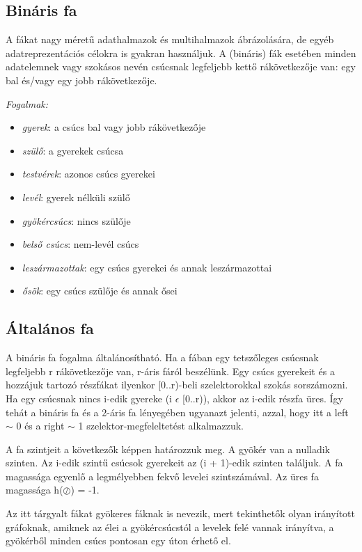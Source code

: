 \documentclass[margin=0px]{article}
\begin{document}
\subsection{Bináris fa}

A fákat nagy méretű adathalmazok és multihalmazok ábrázolására,
de egyéb adatreprezentációs célokra is gyakran használjuk.
A (bináris) fák esetében minden adatelemnek vagy szokásos nevén csúcsnak 
legfeljebb kettő rákövetkezője van: egy bal és/vagy egy
jobb rákövetkezője.

\textit{Fogalmak:}
\begin{itemize}
    \item \textit{gyerek}: a csúcs bal vagy jobb rákövetkezője
    \item \textit{szülő}: a gyerekek csúcsa
    \item \textit{testvérek}: azonos csúcs gyerekei
    \item \textit{levél}: gyerek nélküli szülő
    \item \textit{gyökércsúcs}: nincs szülője
    \item \textit{belső csúcs}: nem-levél csúcs
    \item \textit{leszármazottak}: egy csúcs gyerekei és annak leszármazottai
    \item \textit{ősök}: egy csúcs szülője és annak ősei
\end{itemize}

\subsection{Általános fa}
A bináris fa fogalma általánosítható. Ha a fában egy tetszőleges csúcsnak legfeljebb r rákövetkezője van, r-áris fáról beszélünk. Egy csúcs gyerekeit és a hozzájuk tartozó részfákat ilyenkor [0..r)-beli szelektorokkal szokás sorszámozni. Ha egy csúcsnak nincs i-edik gyereke (i $\epsilon$  [0..r)), akkor az i-edik
részfa üres. Így tehát a bináris fa és a 2-áris fa lényegében ugyanazt jelenti, azzal,
hogy itt a left $\sim$  0 és a right $\sim$ 1 szelektor-megfeleltetést alkalmazzuk.

A fa szintjeit a következők képpen határozzuk meg. A gyökér van a nulladik szinten. Az
i-edik szintű csúcsok gyerekeit az (i + 1)-edik szinten találjuk. A fa magassága egyenlő a legmélyebben fekvő levelei szintszámával. Az üres fa magassága h($\oslash$) = -1.

Az itt tárgyalt fákat gyökeres fáknak is nevezik, mert tekinthetők olyan irányított gráfoknak, amiknek az élei a gyökércsúcstól a levelek felé vannak
irányítva, a gyökérből minden csúcs pontosan egy úton érhető el.
\end{document}
